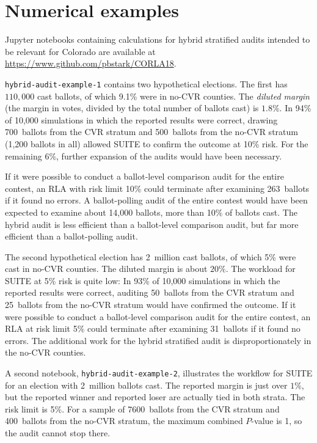 \documentclass[runningheads]{llncs}
\begin{document}
\section{Numerical examples}\label{sec:examples}

Jupyter notebooks containing calculations for hybrid stratified audits intended to be relevant for Colorado are available at \url{https://www.github.com/pbstark/CORLA18}.

\texttt{hybrid-audit-example-1} contains two hypothetical elections. 
The first has $110,000$ cast ballots, of which 
9.1\% were in no-CVR counties. 
The \emph{diluted margin} (the margin in votes, divided by the total number of ballots cast) is $1.8\%$.
In 94\% of 10,000 simulations in which
the reported results were correct, drawing 700~ballots from the CVR stratum and 500~ballots 
from the no-CVR stratum (1,200 ballots in all)
allowed SUITE to confirm the outcome at 10\% risk.
For the remaining 6\%, further expansion of the audits would have been necessary.

If it were possible to conduct a ballot-level comparison audit for the entire contest, 
an RLA with risk limit 10\% could terminate after examining 263~ballots if it found no errors.
A ballot-polling audit of the entire contest would have been expected to examine about 14,000 ballots, more than 10\% of ballots cast.
The hybrid audit is less efficient than a ballot-level comparison audit, but far more efficient than a ballot-polling audit.

The second hypothetical election has 2~million cast ballots, of which 5\% were cast in no-CVR counties.
The diluted margin is about $20\%$.
The workload for SUITE at 5\% risk is quite low:
In 93\% of 10,000 simulations in which
the reported results were correct, auditing 50~ballots from the 
CVR stratum and 25~ballots from the no-CVR stratum
would have confirmed the outcome.
If it were possible to conduct a ballot-level comparison audit for the entire contest, 
an RLA at risk limit 5\% could terminate after examining 31~ballots if it found no errors.
The additional work for the hybrid stratified audit is disproportionately in the no-CVR counties.

A second notebook, \texttt{hybrid-audit-example-2}, illustrates the 
workflow for SUITE for an election with 2~million ballots cast.
The reported margin is just over $1\%$, but the reported winner
and reported loser are actually tied in both strata.  
The risk limit is 5\%.
For a sample of 7600~ballots from the CVR stratum and 400~ballots from the no-CVR stratum, 
the maximum combined $P$-value is 1, so the audit cannot stop there.
\end{document}
